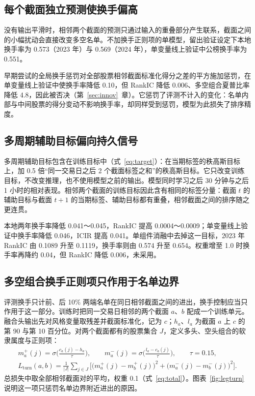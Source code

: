 \documentclass[UTF8,a4paper,zihao=-4,fontset=none]{ctexart}
\newcommand{\figref}[1]{图表~\ref{#1}}
\begin{document}
\subsection{每个截面独立预测使换手偏高}\label{sec:turn-high}

没有输出平滑时，相邻两个截面的预测只通过输入的重叠部分产生联系，截面之间的小幅扰动会直接改变多空名单。不加换手正则项的单模型，留出验证设定下本地换手率为 0.573（2023 年）与 0.569（2024 年），单变量线上验证中公榜换手率为 0.551。

早期尝试的全局换手惩罚对全部股票相邻截面标准化得分之差的平方施加惩罚，在单变量线上验证中使换手率降低 0.10，但 RankIC 降低 0.006、多空组合夏普比率降低 4.8，因此被否决（第~\ref{sec:innov}~章）。它惩罚了评测不计入的变化：名单内部与中间股票的得分变动不影响换手率，却同样受到惩罚，模型为此损失了排序精度。

\subsection{多周期辅助目标偏向持久信号}\label{sec:multi}

多周期辅助目标包含在训练目标中（式~\eqref{eq:target}）：在当期标签的秩高斯目标上，加 0.5 倍“同一交易日之后 2 个截面标签之和”的秩高斯目标。它只改变训练目标，不改变推理，也不使用模型之前的输出。模型同时学习之后 30 分钟与之后 1 小时的相对表现。相邻两个截面的训练目标因此含有相同的标签分量：截面 $t$ 的辅助目标与截面 $t+1$ 的当期标签、辅助目标都有重叠，相邻截面之间的排序随之更连贯。

本地两年换手率降低 0.041～0.045，RankIC 提高 0.0004～0.0009；单变量线上验证中换手率降低 0.046，ICIR 提高 0.041。单组件消融中去掉这一目标，2023 年 RankIC 由 0.1089 升至 0.1119，换手率则由 0.574 升至 0.654。权重增至 1.0 时换手率再降约 0.04，但 RankIC 降低 0.006，未采用。

\subsection{多空组合换手正则项只作用于名单边界}\label{sec:legturn}

评测换手只计前、后 10\% 两端名单在同日相邻截面之间的进出，换手控制应当只作用于这一部分。训练时把同一交易日相邻的两个截面 $a$、$b$ 配成一个训练单元。融合头输出先对风格变量取残差并截面标准化，记为 $c$；$h_a$、$l_a$ 为截面 $a$ 上 $c$ 的第 90 与第 10 百分位。对两个截面都有的股票集合 $J$，定义多头、空头组合的软隶属度与正则项：
\begin{gather}
m^{+}_{a}(j)=\sigma\Big(\frac{c_a(j)-h_a}{\tau}\Big),\qquad m^{-}_{a}(j)=\sigma\Big(\frac{l_a-c_a(j)}{\tau}\Big),\qquad \tau=0.15,\label{eq:member}\\
L_{\text{turn}}(a,b)=\frac{1}{|J|}\sum_{j\in J}\Big[\big(m^{+}_{a}(j)-m^{+}_{b}(j)\big)^2+\big(m^{-}_{a}(j)-m^{-}_{b}(j)\big)^2\Big].\label{eq:legturn}
\end{gather}
总损失中取全部相邻截面对的平均，权重 0.1（式~\eqref{eq:total}）。\figref{fig:legturn} 说明这一项只惩罚名单边界附近进出的原因。
\end{document}
